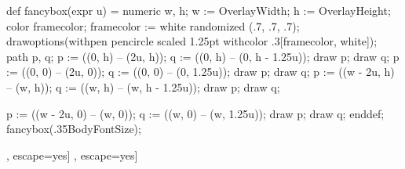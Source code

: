 \startMPinclusions
def fancybox(expr u) =
  numeric w, h;
  w := OverlayWidth; h := OverlayHeight;
  color framecolor; framecolor := white randomized (.7, .7, .7);
  drawoptions(withpen pencircle scaled 1.25pt withcolor .3[framecolor, white]);
  path p, q;
  p := ((0, h) -- (2u, h));
  q := ((0, h) -- (0, h - 1.25u));
  draw p; draw q;
  p := ((0, 0) -- (2u, 0));
  q := ((0, 0) -- (0, 1.25u));
  draw p; draw q;
  p := ((w - 2u, h) -- (w, h));
  q := ((w, h) -- (w, h - 1.25u));
  draw p; draw q;
  
  p := ((w - 2u, 0) -- (w, 0));
  q := ((w, 0) -- (w, 1.25u));
  draw p; draw q;
enddef;
\stopMPinclusions
{}
fancybox(.35BodyFontSize);
\stopuseMPgraphic
{}

\setuptype[color=darkred]
\setuptyping[mycmd]
  [before={\setupinterlinespace[line=3ex]\startstrangebox[width=\textwidth]},
   after={\stopstrangebox\setupinterlinespace[line=3.75ex]},
   style=\switchtobodyfont[tt,10pt],
   escape=yes]
\setuptyping
  [before={\startstrangebox[width=\textwidth]},
   after={\stopstrangebox},
   style=\switchtobodyfont[tt,10pt],
   escape=yes]


\setuplabeltext[cn][Example={例 }]

\newdimen\LeftExampleWidth
\newdimen\RightResultWidth
\def\defineLeftExampleWidth#1{%
  \LeftExampleWidth=\textwidth
  \RightResultWidth=\wd#1
  \ifdim\RightResultWidth>0pt
    \advance\LeftExampleWidth by -\RightResultWidth
    \advance\LeftExampleWidth by -1em
  \fi
}
\def\example[#1][#2]#3#4{%
  \setbox\scratchbox\hbox{#4}%
  \defineLeftExampleWidth{\scratchbox}%
  \placeExample[force][#2]{#3}{%
    \hbox to \textwidth{%
      \hbox{\typeexample[#1,
                        before={\startstrangebox[width=\LeftExampleWidth]},
                        after={\stopstrangebox}]}\hss\unhbox\scratchbox}%
  }%
}
\def\simpleexample[#1]#2{%
  \setbox\scratchbox\hbox{#2}%
  \defineLeftExampleWidth{\scratchbox}%
  \placeExample[force,none][]{}{%
    \hbox to \textwidth{%
      \hbox{\typeexample[#1,
                        before={\startstrangebox[width=\LeftExampleWidth]},
                        after={\stopstrangebox}]}\hss\unhbox\scratchbox}%
  }%
  \blank[back]
}


\def\BibTeX{B\scale[height=.5em]{IB}\TeX}
\stopenvironment
